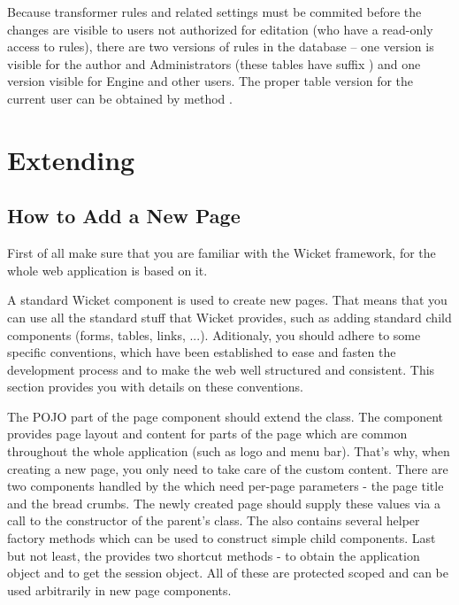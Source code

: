 Because transformer rules and related settings must be commited before the changes are visible to  users not 
authorized for editation (who have a read-only access to rules), there are two versions of rules in the database -- one version is visible for the author and Administrators (these tables have suffix ) and one version visible for Engine and other users. The proper table version for the current user can be obtained by method .

\code{}

\section{Extending}

\subsection{How to Add a New Page}
\label{sec:howToAddANewPage}

First of all make sure that you are familiar with the Wicket framework, for the whole web application is based on it.

A standard Wicket  component is used to create new pages. That means that you can use all the standard stuff that Wicket provides, such as adding standard child components (forms, tables, links, ...). Aditionaly, you should adhere to some specific conventions, which have been established to ease and fasten the development process and to make the web well structured and consistent. This section provides you with details on these conventions.

The POJO part of the page component should extend the  class. The  component provides page layout and content for parts of the page which are common throughout the whole application (such as logo and menu bar). That's why, when creating a new page, you only need to take care of the custom content. There are two components handled by the  which need per-page parameters - the page title and the bread crumbs. The newly created page should supply these values via a call to the constructor of the parent's class. The  also contains several helper factory methods which can be used to construct simple child components. Last but not least, the  provides two shortcut methods -  to obtain the application object and  to get the session object. All of these are protected scoped and can be used arbitrarily in new page components.

